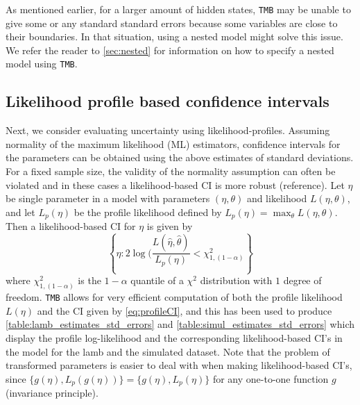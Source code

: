 \documentclass[bimj,fleqn]{w-art}\usepackage[]{graphicx}\usepackage[]{color}
\theoremstyle{plain}
\theoremstyle{definition}
\begin{document}
As mentioned earlier, for a larger amount of hidden states, {\tt{TMB}} may be unable to give some or any standard standard errors because some variables are close to their boundaries.
In that situation, using a nested model might solve this issue.
We refer the reader to \autoref{sec:nested} for information on how to specify a nested model using {\tt{TMB}}.

\subsection{Likelihood profile based confidence intervals}
\label{sec:likelihood}

Next, we consider evaluating uncertainty using likelihood-profiles.
Assuming normality of the maximum likelihood (ML) estimators, confidence intervals for the parameters can be obtained using the above estimates of standard deviations.
For a fixed sample size, the validity of the normality assumption can often be violated and in these cases a likelihood-based CI is more robust (reference).
Let $\eta$ be single parameter in a model with parameters $(\eta, \theta)$ and likelihood $L(\eta, \theta)$, and let $L_p(\eta)$ be the profile likelihood defined by $L_p(\eta)=\max_{\theta} L(\eta, \theta)$.
Then a likelihood-based CI for $\eta$ is given by
\begin{equation}
\left\{\eta: 2\log(\frac{L(\hat{\eta},\hat{\theta})}{L_p(\eta)} < \chi^{2}_{1, (1-\alpha)}\right\}
\label{eq:profileCI}
\end{equation}
where $\chi^{2}_{1, (1-\alpha)}$ is the $1-\alpha$ quantile of a $\chi^2$ distribution with $1$ degree of freedom.
{\tt{TMB}} allows for very efficient computation of both the profile likelihood $L(\eta)$ and the CI given by \autoref{eq:profileCI}, and this has been used to produce \autoref{table:lamb_estimates_std_errors} and \autoref{table:simul_estimates_std_errors} which display the profile log-likelihood and the corresponding likelihood-based CI's in the model for the lamb and the simulated dataset.
Note that the problem of transformed parameters is easier to deal with when making likelihood-based CI's, since $\{g(\eta), L_p(g(\eta))\}=\{g(\eta), L_p(\eta)\}$ for any one-to-one function $g$ (invariance principle).
\end{document}
